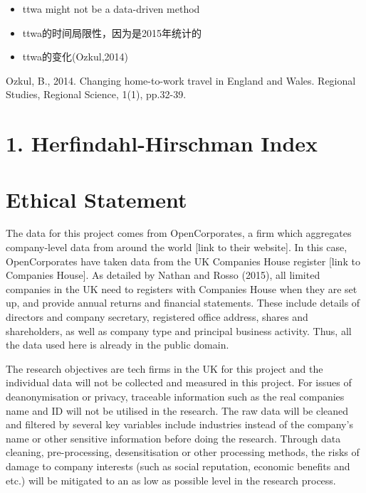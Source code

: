 \documentclass[
  12pt,
  oneside]{book}
\providecommand{\tightlist}{%
  \setlength{\itemsep}{0pt}\setlength{\parskip}{0pt}}
\begin{document}
\begin{itemize}
\tightlist
\item
  ttwa might not be a data-driven method
\item
  ttwa的时间局限性，因为是2015年统计的
\item
  ttwa的变化(Ozkul,2014)
\end{itemize}

Ozkul, B., 2014. Changing home-to-work travel in England and Wales. Regional Studies, Regional Science, 1(1), pp.32-39.

\hypertarget{herfindahl-hirschman-index}{%
\section{1. Herfindahl-Hirschman Index}\label{herfindahl-hirschman-index}}

\hypertarget{ethical-statement}{%
\section{Ethical Statement}\label{ethical-statement}}

The data for this project comes from OpenCorporates, a firm which aggregates company-level data from around the world {[}link to their website{]}. In this case, OpenCorporates have taken data from the UK Companies House register {[}link to Companies House{]}. As detailed by Nathan and Rosso (2015), all limited companies in the UK need to registers with Companies House when they are set up, and provide annual returns and financial statements. These include details of directors and company secretary, registered office address, shares and shareholders, as well as company type and principal business activity. Thus, all the data used here is already in the public domain.

The research objectives are tech firms in the UK for this project and the individual data will not be collected and measured in this project. For issues of deanonymisation or privacy, traceable information such as the real companies name and ID will not be utilised in the research. The raw data will be cleaned and filtered by several key variables include industries instead of the company's name or other sensitive information before doing the research. Through data cleaning, pre-processing, desensitisation or other processing methods, the risks of damage to company interests (such as social reputation, economic benefits and etc.) will be mitigated to an as low as possible level in the research process.
\end{document}
